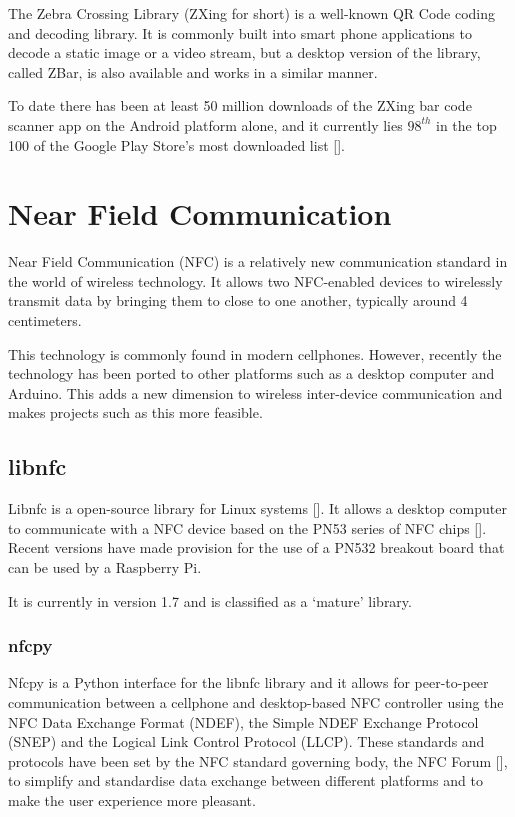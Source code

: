 The Zebra Crossing Library (ZXing for short) is a well-known QR Code coding and decoding
library.
It is commonly built into smart phone applications to decode a static image or a video stream,
but a desktop version of the library, called ZBar, is also available and works in a similar
manner. 

To date there has been at least 50 million downloads of the ZXing
bar code scanner app on the Android platform alone, and it currently lies $98^{th}$ in the top
100 of the Google Play Store's most downloaded list [\cite{website:barcodescanner}].

\section{Near Field Communication}

Near Field Communication (NFC) is a relatively new communication standard in the world of
wireless technology. It allows two NFC-enabled devices to wirelessly transmit data by bringing
them to close to one another, typically around 4 centimeters.

This technology is commonly found in modern cellphones. However, recently the technology has
been ported to other platforms such as a desktop computer and Arduino. This adds a new
dimension to wireless inter-device communication and makes projects such as this more
feasible.

\subsection{libnfc}

Libnfc is a open-source library for Linux systems [\cite{website:libnfc}]. It allows a
desktop computer to communicate with a NFC device based on the PN53 series of NFC chips
[\cite{website:libnfc-hardware}]. Recent versions have made provision for the use of a PN532
breakout board that can be used by a Raspberry Pi. 

It is currently in version 1.7 and is classified as a `mature' library. 

\subsubsection{nfcpy}

Nfcpy is a Python interface for the libnfc library and it allows for peer-to-peer communication
between a cellphone and desktop-based NFC controller using the NFC Data Exchange Format
(NDEF), the Simple NDEF Exchange Protocol (SNEP) and the Logical Link Control Protocol (LLCP).
These standards and protocols have been set by the NFC standard governing body, the NFC Forum
[\cite{website:nfc-forum}], to simplify and standardise data exchange between different
platforms and to make the user experience more pleasant.

